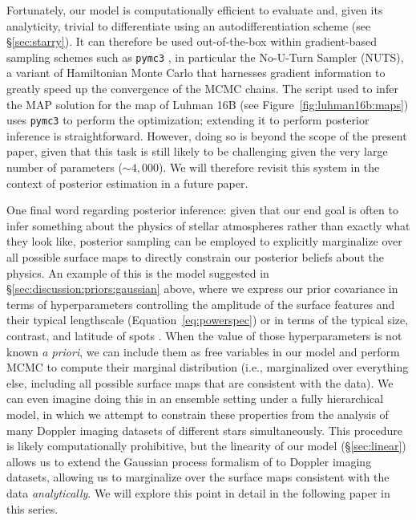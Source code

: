 \documentclass[modern]{aastex631}
\begin{document}
Fortunately, our model is computationally efficient to evaluate and, given its analyticity, trivial to differentiate using an autodifferentiation scheme (see \S\ref{sec:starry}).
It can therefore be used out-of-the-box within gradient-based sampling schemes such as \texttt{pymc3} \citep{Salvatier2016}, in particular the No-U-Turn Sampler (NUTS), a variant of Hamiltonian Monte Carlo that harnesses gradient information to greatly speed up the convergence of the MCMC chains. 
The script used to infer the MAP solution for the map of Luhman 16B (see Figure~\ref{fig:luhman16b:maps}) uses \texttt{pymc3} to perform the optimization; extending it to perform posterior inference is straightforward.
However, doing so is beyond the scope of the present paper, given that this task is still likely to be challenging given the very large number of parameters (${\sim}4{,}000$). 
We will therefore revisit this system in the context of posterior estimation in a future paper.

One final word regarding posterior inference: given that our end goal is often to infer something about the physics of stellar atmospheres rather than exactly what they look like, posterior sampling can be employed to explicitly marginalize over all possible surface maps to directly constrain our posterior beliefs about the physics.
An example of this is the model suggested in \S\ref{sec:discussion:priors:gaussian} above, where we express our prior covariance in terms of hyperparameters controlling the amplitude of the surface features and their typical lengthscale (Equation~\ref{eq:powerspec}) or in terms of the typical size, contrast, and latitude of spots \citep{Luger2021b,Luger2021d}.
When the value of those hyperparameters is not known \emph{a priori}, we can include them as free variables in our model and perform MCMC to compute their marginal distribution (i.e., marginalized over everything else, including all possible surface maps that are consistent with the data).
We can even imagine doing this in an ensemble setting under a fully hierarchical model, in which we attempt to constrain these properties from the analysis of many Doppler imaging datasets of different stars simultaneously.
This procedure is likely computationally prohibitive, but the linearity of our model (\S\ref{sec:linear}) allows us to extend the Gaussian process formalism of \citet{Luger2021b} to Doppler imaging datasets, allowing us to marginalize over the surface maps consistent with the data \emph{analytically}.
We will explore this point in detail in the following paper in this series.
\end{document}
